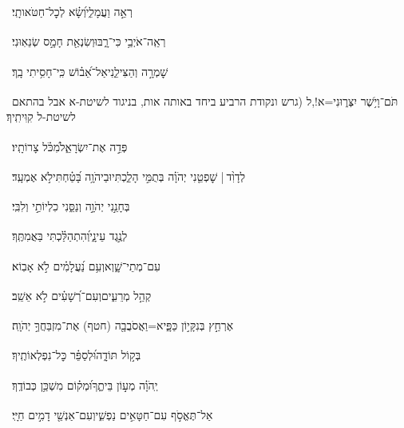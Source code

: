 \documentclass[12pt]{article}
\newcommand{\loc}[1]{\textsuperscript{\locf{#1}}}
\begin{document}
{\loc{ יח}~}‏רְאֵ֣ה  וַעֲמָלִ֑י{\hfill}וְ֝שָׂ֗א לְכׇל־חַטֹּאותָֽי׃\par

{\loc{ יט}~}‏רְאֵֽה־אֹיְבַ֥י כִּי־רָ֑בּוּ{\hfill}וְשִׂנְאַ֖ת חָמָ֣ס שְׂנֵאֽוּנִי׃\par

{\loc{ כ}~}‏שׇׁמְרָ֣ה  וְהַצִּילֵ֑נִי{\hfill}אַל־אֵ֝ב֗וֹשׁ כִּֽי־חָסִ֥יתִי בָֽךְ׃\par

{\loc{ כא}~}‏תֹּם־וָיֹ֥שֶׁר יִצְּר֑וּנִי{\hfill}=א!,ל (גרש ונקודת הרביע ביחד באותה אות, בניגוד לשיטת-א אבל בהתאם לשיטת-ל קִוִּיתִֽיךָ׃\par

{\loc{ כב}~}‏פְּדֵ֣ה  אֶת־יִשְׂרָאֵ֑ל{\hfill}מִ֝כֹּ֗ל צָרוֹתָֽיו׃\par\pend
\ledpb
\pstart[\subsection*{\textcolor{red}{פרק כו}}]\label{פרק כו}
{\loc{ א}~}‏לְדָוִ֨ד |  שׇׁפְטֵ֤נִי יְהֹוָ֗ה\newline\hspace*{.5em} בְּתֻמִּ֣י הָלַ֑כְתִּי{\hfill}וּבַיהֹוָ֥ה בָּ֝טַ֗חְתִּי\hspace{1em}לֹ֣א אֶמְעָֽד׃\par

{\loc{ ב}~}‏בְּחָנֵ֣נִי יְהֹוָ֣ה וְנַסֵּ֑נִי{\hfill} כִלְיוֹתַ֣י וְלִבִּֽי׃\par

{\loc{ ג}~}‏ לְנֶ֣גֶד עֵינָ֑י{\hfill}וְ֝הִתְהַלַּ֗כְתִּי בַּאֲמִתֶּֽךָ׃\par

{\loc{ ד}~}‏ עִם־מְתֵי־שָׁ֑וְא{\hfill}וְעִ֥ם נַ֝עֲלָמִ֗ים לֹ֣א אָבֽוֹא׃\par

{\loc{ ה}~}‏ קְהַ֣ל מְרֵעִ֑ים{\hfill}וְעִם־רְ֝שָׁעִ֗ים לֹ֣א אֵשֵֽׁב׃\par

{\loc{ ו}~}‏אֶרְחַ֣ץ בְּנִקָּי֣וֹן כַּפָּ֑י{\hfill}א=וַאֲסֹבֲבָ֖ה (חטף) אֶת־מִזְבַּחֲךָ֣ יְהֹוָֽה׃\par

{\loc{ ז}~}‏ בְּק֣וֹל תּוֹדָ֑ה{\hfill}וּ֝לְסַפֵּ֗ר כׇּל־נִפְלְאוֹתֶֽיךָ׃\par

{\loc{ ח}~}‏יְֽהֹוָ֗ה  מְע֣וֹן בֵּיתֶ֑ךָ{\hfill}וּ֝מְק֗וֹם מִשְׁכַּ֥ן כְּבוֹדֶֽךָ׃\par

{\loc{ ט}~}‏אַל־תֶּאֱסֹ֣ף עִם־חַטָּאִ֣ים נַפְשִׁ֑י{\hfill}וְעִם־אַנְשֵׁ֖י דָמִ֣ים חַיָּֽי׃\par
\end{document}
